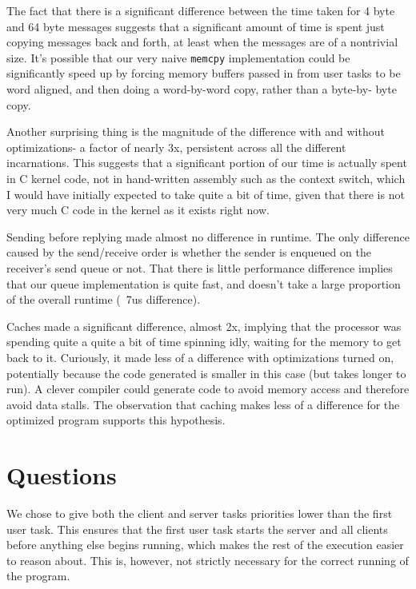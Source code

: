 \documentclass[titlepage]{article}
\begin{document}


The fact that there is a significant difference between the time taken for 4
byte and 64 byte messages suggests that a significant amount of time is spent
just copying messages back and forth, at least when the messages are of a
nontrivial size. It's possible that our very naive \texttt{memcpy} implementation could
be significantly speed up by forcing memory buffers passed in from user tasks
to be word aligned, and then doing a word-by-word copy, rather than a byte-by-
byte copy.

Another surprising thing is the magnitude of the difference with and without
optimizations- a factor of nearly 3x, persistent across all the different
incarnations. This suggests that a significant portion of our time is actually
spent in C kernel code, not in hand-written assembly such as the context switch,
which I would have initially expected to take quite a bit of time, given that
there is not very much C code in the kernel as it exists right now.

Sending before replying made almost no difference in runtime.
The only difference caused by the send/receive order is whether the sender is
enqueued on the receiver's send queue or not.
That there is little performance difference implies that our queue
implementation is quite fast, and doesn't take a large proportion of the overall
runtime (~7us difference).

Caches made a significant difference, almost 2x, implying that the processor was
spending quite a quite a bit of time spinning idly, waiting for the memory to
get back to it. Curiously, it made less of a difference with optimizations
turned on, potentially because the code generated is smaller in this case (but
takes longer to run).
A clever compiler could generate code to avoid memory access and therefore
avoid data stalls.
The observation that caching makes less of a difference for the optimized program
supports this hypothesis.

\section{Questions}
We chose to give both the client and server tasks priorities lower than
the first user task.
This ensures that the first user task starts the server and all clients
before anything else begins running, which makes the rest of the execution
easier to reason about.
This is, however, not strictly necessary for the correct running of the program.
\end{document}
